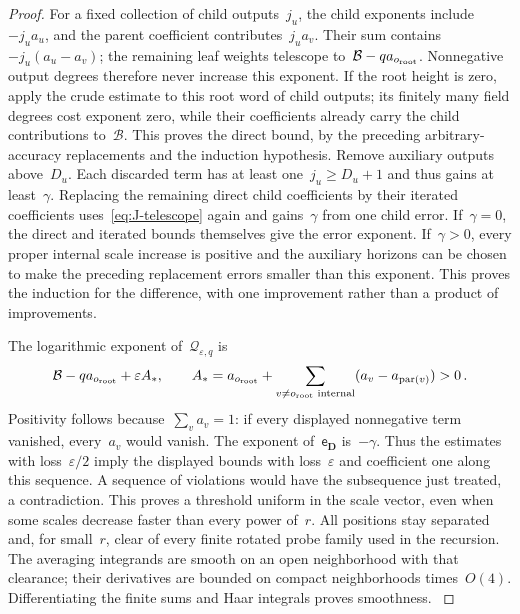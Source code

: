 \begin{proof}
For a fixed collection of child outputs~$j_u$, the child exponents include~$-j_ua_u$, and the parent coefficient contributes~$j_ua_v$. Their sum contains~$-j_u(a_u-a_v)$; the remaining leaf weights telescope to~$\mathcal B-qa_{o_{\rm root}}$. Nonnegative output degrees therefore never increase this exponent. If the root height is zero, apply the crude estimate to this root word of child outputs; its finitely many field degrees cost exponent zero, while their coefficients already carry the child contributions to~$\mathcal B$. This proves the direct bound, by the preceding arbitrary-accuracy replacements and the induction hypothesis. Remove auxiliary outputs above~$D_u$. Each discarded term has at least one~$j_u\ge D_u+1$ and thus gains at least~$\gamma$. Replacing the remaining direct child coefficients by their iterated coefficients uses~\eqref{eq:J-telescope} again and gains~$\gamma$ from one child error. If~$\gamma=0$, the direct and iterated bounds themselves give the error exponent. If~$\gamma>0$, every proper internal scale increase is positive and the auxiliary horizons can be chosen to make the preceding replacement errors smaller than this exponent. This proves the induction for the difference, with one improvement rather than a product of improvements.

The logarithmic exponent of~$\mathcal Q_{\varepsilon,q}$ is
\begin{equation*}
\mathcal B-qa_{o_{\rm root}}+\varepsilon A_*,\qquad
A_*=a_{o_{\rm root}}+\sum_{v\ne o_{\rm root}\text{ internal}}(a_v-a_{\operatorname{par}(v)})>0\,.
\end{equation*}
Positivity follows because~$\sum_va_v=1$: if every displayed nonnegative term vanished, every~$a_v$ would vanish. The exponent of~$\mathsf e_{\boldsymbol D}$ is~$-\gamma$. Thus the estimates with loss~$\varepsilon/2$ imply the displayed bounds with loss~$\varepsilon$ and coefficient one along this sequence. A sequence of violations would have the subsequence just treated, a contradiction. This proves a threshold uniform in the scale vector, even when some scales decrease faster than every power of~$r$. All positions stay separated and, for small~$r$, clear of every finite rotated probe family used in the recursion. The averaging integrands are smooth on an open neighborhood with that clearance; their derivatives are bounded on compact neighborhoods times~$O(4)$. Differentiating the finite sums and Haar integrals proves smoothness.\qedhere
\label{proof:J1.4-end}
\end{proof}

